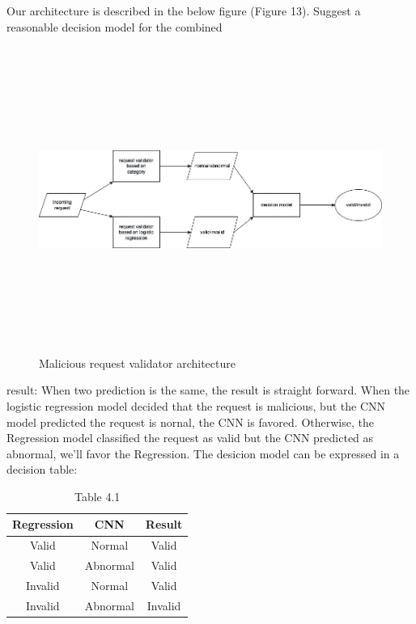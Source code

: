 Our architecture is described in the below figure (Figure 13). Suggest a reasonable decision model for the combined 
\begin{figure}[!h]
   
     \centering
     \includegraphics[width=\linewidth, height=10cm,keepaspectratio]{figures/architecture.jpg}
   \caption{Malicious request validator architecture}
\end{figure}
result: When two prediction is the same, the result is straight forward. When the logistic regression model decided that the request is malicious, but the CNN model predicted the request is nornal, the CNN is favored. Otherwise, the Regression model classified the request as valid but the CNN predicted as abnormal, we'll favor the Regression. The desicion model can be expressed in a decision table: \\

\begin{table}[h]
\begin{center}
\begin{tabular}{||c c c ||} 
 \hline
 Regression & CNN & Result  \\ [0.5ex] 
 \hline\hline
 Valid & Normal & Valid \\ 
 
 Valid & Abnormal & Valid  \\

 Invalid & Normal & Valid  \\
 
 Invalid & Abnormal & Invalid  \\ [1ex] 
\hline
\end{tabular}
\end{center}
\caption{\label{demo-table}Table 4.1}
\end{table}


